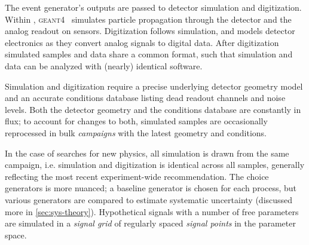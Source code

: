 The event generator's outputs are passed to detector simulation and digitization.
Within \atlas, \textsc{geant4}~\cite{geant} simulates particle propagation through the detector and the analog readout on sensors.
Digitization follows simulation, and models detector electronics as they convert analog signals to digital data.
After digitization simulated samples and data share a common format, such that simulation and data can be analyzed with (nearly) identical software.

Simulation and digitization require a precise underlying detector geometry model and an accurate conditions database listing dead readout channels and noise levels.
Both the detector geometry and the conditions database are constantly in flux; to account for changes to both, simulated samples are occasionally reprocessed in bulk \emph{campaigns} with the latest geometry and conditions.

In the case of searches for new physics, all simulation is drawn from the same campaign, i.e. simulation and digitization is identical across all samples, generally reflecting the most recent experiment-wide recommendation.
The choice generators is more nuanced; a baseline generator is chosen for each process, but various generators are compared to estimate systematic uncertainty (discussed more in \cref{sec:sys-theory}).
Hypothetical signals with a number of free parameters are simulated in a \emph{signal grid} of regularly spaced \emph{signal points} in the parameter space.


